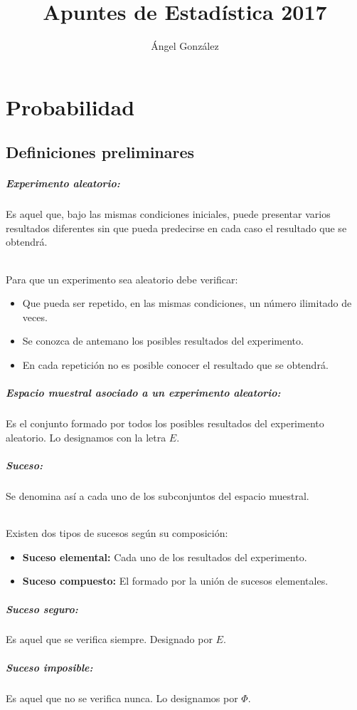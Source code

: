 \documentclass[12pt,a4paper,oneside,onecolumn,titlepage]{book}
\author{Ángel González}
\title{Apuntes de Estadística 2017}
\begin{document}
\chapter{Probabilidad}
\section{Definiciones preliminares}
\paragraph{Experimento aleatorio:}
Es aquel que, bajo las mismas condiciones iniciales, puede presentar varios resultados diferentes sin que pueda predecirse en cada caso el resultado que se obtendrá.
\subparagraph{}
Para que un experimento sea aleatorio debe verificar:
\begin{itemize}
\item Que pueda ser repetido, en las mismas condiciones, un número ilimitado de veces.
\item Se conozca de antemano los posibles resultados del experimento.
\item En cada repetición no es posible conocer el resultado que se obtendrá.
\end{itemize}
\paragraph{Espacio muestral asociado a un experimento aleatorio:}
Es el conjunto formado por todos los posibles resultados del experimento aleatorio. Lo designamos con la letra $E$.
\paragraph{Suceso:} Se denomina así a cada uno de los subconjuntos del espacio muestral.
\subparagraph{}
Existen dos tipos de sucesos según su composición:
\begin{itemize}
\item \textbf{Suceso elemental:} Cada uno de los resultados del experimento.
\item \textbf{Suceso compuesto:} El formado por la unión de sucesos elementales.
\end{itemize}
\paragraph{Suceso seguro:}
Es aquel que se verifica siempre. Designado por $E$.
\paragraph{Suceso imposible:}
Es aquel que no se verifica nunca. Lo designamos por $\Phi$.
\end{document}
